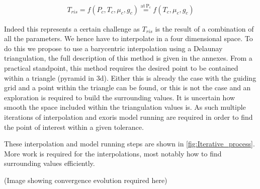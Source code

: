 \begin{align} 
    T_{ris} = f(P_c,T_c,\mu_c,g_c) \overset{\mathrm{at \, P_c}}{=} f(T_c,\mu_c,g_c)
\end{align}

Indeed this represents a certain challenge as $T_{ris}$ is the result of a combination of all the parameters. We hence have to interpolate in a four dimensional space. To do this we propose to use a barycentric interpolation using a Delaunay triangulation, the full description of this method is given in the annexes. From a practical standpoint, this method requires the desired point to be contained within a triangle (pyramid in 3d). Either this is already the case with the guiding grid and a point within the triangle can be found, or this is not the case and an exploration is required to build the surrounding values. It is uncertain how smooth the space included within the triangulation values is. As such multiple iterations of interpolation and exoris model running are required in order to find the point of interest within a given tolerance. \par

These interpolation and model running steps are shown in \cref{fig:Iterative_process}. More work is required for the interpolations, most notably how to find surrounding values efficiently.

(Image showing convergence evolution required here)